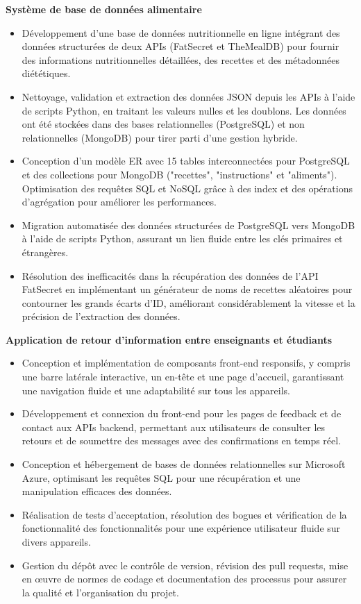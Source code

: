\documentclass[10pt]{article}
\begin{document}
\textbf{Système de base de données alimentaire}
\vspace{-4mm}
\begin{itemize}[left=0.15in, itemsep=0pt, label=--]
    \item Développement d'une base de données nutritionnelle en ligne intégrant des données structurées de deux APIs (FatSecret et TheMealDB) pour fournir des informations nutritionnelles détaillées, des recettes et des métadonnées diététiques.
    \item Nettoyage, validation et extraction des données JSON depuis les APIs à l'aide de scripts Python, en traitant les valeurs nulles et les doublons. Les données ont été stockées dans des bases relationnelles (PostgreSQL) et non relationnelles (MongoDB) pour tirer parti d'une gestion hybride.
    \item Conception d'un modèle ER avec 15 tables interconnectées pour PostgreSQL et des collections pour MongoDB ("recettes", "instructions" et "aliments"). Optimisation des requêtes SQL et NoSQL grâce à des index et des opérations d'agrégation pour améliorer les performances.
    \item Migration automatisée des données structurées de PostgreSQL vers MongoDB à l'aide de scripts Python, assurant un lien fluide entre les clés primaires et étrangères.
    \item Résolution des inefficacités dans la récupération des données de l'API FatSecret en implémentant un générateur de noms de recettes aléatoires pour contourner les grands écarts d'ID, améliorant considérablement la vitesse et la précision de l'extraction des données.
\end{itemize}

\textbf{Application de retour d'information entre enseignants et étudiants} 
\vspace{-4mm}
\begin{itemize}[left=0.15in, itemsep=0pt, label=--]
    \item Conception et implémentation de composants front-end responsifs, y compris une barre latérale interactive, un en-tête et une page d'accueil, garantissant une navigation fluide et une adaptabilité sur tous les appareils.
    \item Développement et connexion du front-end pour les pages de feedback et de contact aux APIs backend, permettant aux utilisateurs de consulter les retours et de soumettre des messages avec des confirmations en temps réel.
    \item Conception et hébergement de bases de données relationnelles sur Microsoft Azure, optimisant les requêtes SQL pour une récupération et une manipulation efficaces des données.
    \item Réalisation de tests d'acceptation, résolution des bogues et vérification de la fonctionnalité des fonctionnalités pour une expérience utilisateur fluide sur divers appareils.
    \item Gestion du dépôt avec le contrôle de version, révision des pull requests, mise en œuvre de normes de codage et documentation des processus pour assurer la qualité et l'organisation du projet.
\end{itemize}
\end{document}
